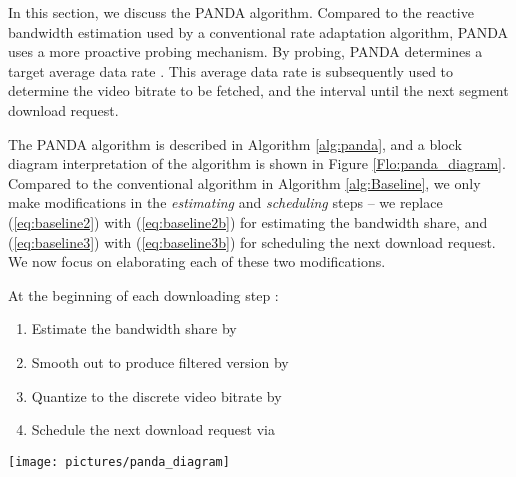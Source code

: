 \documentclass[conference]{IEEEtran}
\theoremstyle{plain}
\theoremstyle{definition}
\theoremstyle{plain}
\theoremstyle{plain}
\begin{document}
In this section, we discuss the PANDA algorithm. Compared to the reactive
bandwidth estimation used by a conventional rate adaptation algorithm,
PANDA uses a more proactive probing mechanism. By probing, PANDA determines
a target average data rate . This average data rate is subsequently
used to determine the video bitrate  to be fetched, and the interval
 until the next segment download request.

The PANDA algorithm is described in Algorithm \ref{alg:panda}, and
a block diagram interpretation of the algorithm is shown in Figure
\ref{Flo:panda_diagram}. Compared to the conventional algorithm in
Algorithm \ref{alg:Baseline}, we only make modifications in the \emph{estimating}
and \emph{scheduling} steps -- we replace (\ref{eq:baseline2}) with
(\ref{eq:baseline2b}) for estimating the bandwidth share, and (\ref{eq:baseline3})
with (\ref{eq:baseline3b}) for scheduling the next download request.
We now focus on elaborating each of these two modifications.

\begin{algorithm}
At the beginning of each downloading step : 
\begin{enumerate}
\item Estimate the bandwidth share  by


\item Smooth out  to produce filtered version 
by 


\item Quantize  to the discrete video bitrate 
by 


\item Schedule the next download request via 


\end{enumerate}
\caption{PANDA\label{alg:panda}}
\vspace{-0.1in}
\end{algorithm}


\begin{figure*}
\begin{centering}
\texttt{[image: pictures/panda\_diagram]}\vspace{-0.07in}

\par\end{centering}

\caption{Block diagram for PANDA (Algorithm \ref{alg:panda}). Module D represents
delay of one adaptation step.}


\label{Flo:panda_diagram} \vspace{-0.05in}
\end{figure*}
\end{document}
